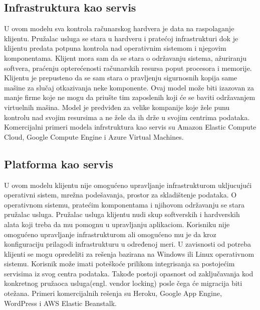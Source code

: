 \documentclass[12pt,oneside]{memoir}
\begin{document}
\subsection{Infrastruktura kao servis}

U ovom modelu sva kontrola računarskog hardvera je data na raspolaganje klijentu. Pružalac usluga se stara u hardveru i pratećoj infrastrukturi dok je klijentu predata potpuna kontrola nad operativnim sistemom i njegovim komponentama. Klijent mora sam da se stara o održavanju sistema, ažuriranju softvera, praćenju opterećenosti računarskih resursa poput procesora i memorije. Klijentu je prepusteno da se sam stara o pravljenju sigurnosnih kopija same mašine za slučaj otkazivanja neke komponente. Ovaj model može biti izazovan za manje firme koje ne mogu da priušte tim zaposlenih koji će se baviti održavanjem virtuelnih mašina. Model je predviđen za velike kompanije koje žele punu kontrolu nad svojim resursima a ne žele da ih drže u svojim centrima podataka\cite{cc}. Komercijalni primeri modela infrstruktura kao servis su Amazon Elastic Compute Cloud, Google Compute Engine i Azure Virtual Machines. %

 
\subsection{Platforma kao servis}
U ovom modelu klijentu nije omogućeno upravljanje infrastrukturom ukljucujući operativni sistem, mrežna podešavanja, prostor za skladištenje podataka. O operativnom sistemu, pratećim komponentama i njihovom održavanju se stara pružalac usluga. Pružalac usluga klijentu nudi skup softverskih i hardverskih alata koji treba da mu pomognu u upravljanju aplikaciom. Korisniku nije omogućeno upravljanje infrastrukturom ali omogućeno mu je da kroz konfiguraciju prilagodi infrastrukturu u određenoj meri. U zavisnosti od potreba klijenti se mogu opredeliti za rešenja bazirana na Windows ili Linux operativnom sistemu. Korisnik može imati poteškoće prilikom integrisanja sa postojećim servisima iz svog centra podataka. Takođe postoji opasnost od zaključavanja kod konkretnog pružaoca usluga(engl. vendor locking) posle čega će migracija biti otežana\cite{cc}. Primeri komercijalnih rešenja su Heroku, Google App Engine, WordPress i AWS Elastic Beanstalk. %
\end{document}
